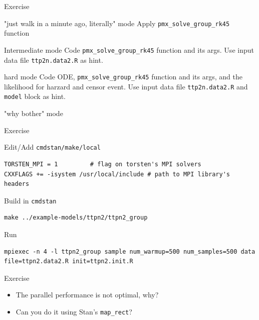 \documentclass[presentation, allowframebreaks]{beamer}
\begin{document}
\begin{frame}[fragile,label={sec:org3f0c592}]{Exercise}
 \begin{block}{"just walk in a minute ago, literally" mode}
Apply \texttt{pmx\_solve\_group\_rk45} function
\end{block}
\begin{block}{Intermediate mode}
Code \texttt{pmx\_solve\_group\_rk45} function and its args. Use input data file \texttt{ttp2n.data2.R} as hint.
\end{block}
\begin{block}{hard mode}
Code ODE, \texttt{pmx\_solve\_group\_rk45} function and its args,
and the likelihood for harzard and censor event. Use input
data file \texttt{ttp2n.data2.R} and \texttt{model} block as hint.
\end{block}
\begin{block}{"why bother" mode}
\end{block}
\end{frame}

\begin{frame}[fragile,label={sec:org11c19a5}]{Exercise}
 \begin{block}{Edit/Add \texttt{cmdstan/make/local}}
\begin{verbatim}
TORSTEN_MPI = 1         # flag on torsten's MPI solvers
CXXFLAGS += -isystem /usr/local/include # path to MPI library's headers
\end{verbatim}
\end{block}
\begin{block}{Build in \texttt{cmdstan}}
\begin{verbatim}
make ../example-models/ttpn2/ttpn2_group
\end{verbatim}
\end{block}
\begin{block}{Run}
\begin{verbatim}
mpiexec -n 4 -l ttpn2_group sample num_warmup=500 num_samples=500 data file=ttpn2.data2.R init=ttpn2.init.R
\end{verbatim}
\end{block}
\end{frame}

\begin{frame}[fragile,label={sec:org2f01a11}]{Exercise}
 \begin{itemize}
\item The parallel performance is not optimal, why?
\item Can you do it using Stan's \texttt{map\_rect}?
\end{itemize}
\end{frame}
\end{document}
